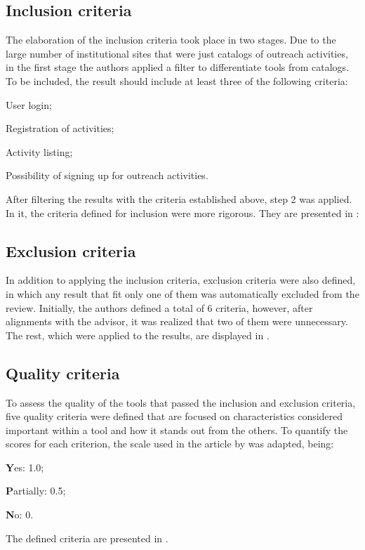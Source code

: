 \subsection{Inclusion criteria}\label{sec:gl-planning-inc}

The elaboration of the inclusion criteria took place in two stages. Due to the large number of institutional sites that were just catalogs of outreach activities, in the first stage the authors applied a filter to differentiate tools from catalogs. To be included, the result should include at least three of the following criteria:
\begin{inparaenum}[(a)]
  \item User login;
  \item Registration of activities;
  \item Activity listing;
  \item Possibility of signing up for outreach activities.
\end{inparaenum}

After filtering the results with the criteria established above, step 2 was applied. In it, the criteria defined for inclusion were more rigorous. They are presented in :



\subsection{Exclusion criteria}\label{sec:gl-planning-exc}

In addition to applying the inclusion criteria, exclusion criteria were also defined, in which any result that fit only one of them was automatically excluded from the review. Initially, the authors defined a total of 6 criteria, however, after alignments with the advisor, it was realized that two of them were unnecessary. The rest, which were applied to the results, are displayed in .



\subsection{Quality criteria}\label{sec:gl-planning-qlty}

To assess the quality of the tools that passed the inclusion and exclusion criteria, five quality criteria were defined that are focused on characteristics considered important within a tool and how it stands out from the others. To quantify the scores for each criterion, the scale used in the article by \cite{iung2020systematic} was adapted, being:
\begin{inparaenum}[(i)]
  \item \textbf{Y}es: 1.0;
  \item \textbf{P}artially: 0.5;
  \item \textbf{N}o: 0.
\end{inparaenum}
The defined criteria are presented in .

